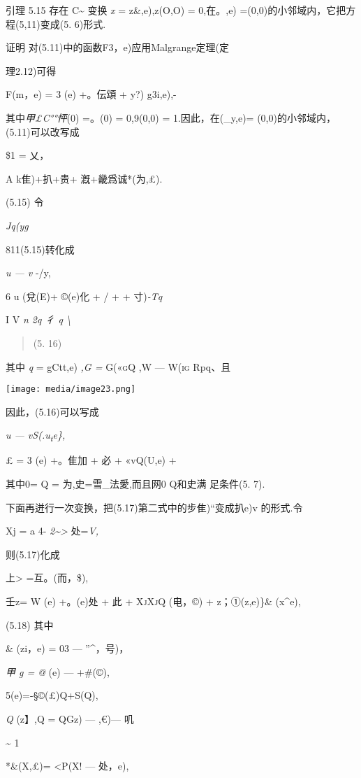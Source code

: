\documentclass{article}
\begin{document}
引理 5.15 存在 C\textasciitilde{} 变换 \emph{x} = z\&,e),z(O,O) =
0,在。,e) =(0,0)的小邻域内，它把方程(5,11)变成(5. 6)形式.

证明 对(5.11)中的函数F3，e)应用Malgrange定理(定

理2.12)可得

F(m，e) = 3 (e) +。伝頌 + y?) g3i,e),-

其中\emph{甲£C°°怦}(0) =。(0) = 0,9(0,0) = 1.因此，在(\_y,e)=
(0,0)的小邻域内，(5.11)可以改写成

\$1 = 乂，

A k隹)+扒+贵+ 漑+畿爲诚*(为,£).

(5.15) 令

\emph{Jq(yg}

811(5.15)转化成

\emph{u --- v} -/y,

6 u (兌(E)+ ©(e)化 + / + + 寸)\emph{-Tq}

I V \emph{n 2q 彳 q \textbackslash{}}

\begin{quote}
(5. 16)
\end{quote}

其中 \emph{q} = gCtt,e) \emph{,G =} \textsc{G(«gQ} ,W --- \textsc{W(ig}
Rpq、且

\texttt{[image: media/image23.png]}

因此，(5.16)可以写成

\emph{u --- vS(.u\textsubscript{t}e\},}

£ = 3 (e) +。隹加 + 必 + «vQ(U,e) +

其中0= Q = 为,史=雪\_法愛,而且网0 Q和史满 足条件(5. 7).

下面再迸行一次变换，把(5.17)第二式中的步隹)``变成扒e)v 的形式.令

Xj = a 4- \emph{2\textasciitilde{}\textgreater{}} 处=\emph{V,}

则(5.17)化成

上\textgreater{} =互。(而，\$),

壬z= W (e) +。(e)处 + 此 + \textsc{XjXjQ} (电，©) + z；①(z,e)\}\&
(x\^{}e),

(5.18) 其中

\& (zi，e) = 03 --- ''\^{}，号)，

\emph{甲 g = @} (e) --- +\#(©),

5(e)=-§©(£)Q+S(Q),

\emph{Q} (z】,Q = QGz) --- ,€)--- 叽

\textasciitilde{} 1

*\&(X,£)= \textless{}P(X! --- 处，e),
\end{document}
